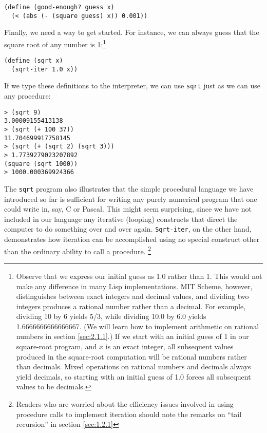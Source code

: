 \begin{verbatim}
(define (good-enough? guess x)
  (< (abs (- (square guess) x)) 0.001))
\end{verbatim}

Finally, we need a way to get started.  For instance, we can always
guess that the square root of any number is 1:\footnote{Observe that
  we express our initial guess as 1.0 rather than 1.  This would not
  make any difference in many Lisp implementations. MIT Scheme,
  however, distinguishes between exact integers and decimal values,
  and dividing two integers produces a rational number rather than a
  decimal.  For example, dividing 10 by 6 yields 5/3, while dividing
  10.0 by 6.0 yields 1.6666666666666667.  (We will learn how to
  implement arithmetic on rational numbers in section
  \ref{sec:2.1.1}.)  If we start with an initial guess of 1 in our
  square-root program, and $x$ is an exact integer, all subsequent
  values produced in the square-root computation will be rational
  numbers rather than decimals.  Mixed operations on rational numbers
  and decimals always yield decimals, so starting with an initial
  guess of 1.0 forces all subsequent values to be decimals.}

\begin{verbatim}
(define (sqrt x)
  (sqrt-iter 1.0 x))
\end{verbatim}

If we type these definitions to the interpreter, we can use \texttt{sqrt}
just as we can use any procedure:

\begin{verbatim}
> (sqrt 9)
3.00009155413138
> (sqrt (+ 100 37))
11.704699917758145
> (sqrt (+ (sqrt 2) (sqrt 3)))
> 1.7739279023207892
(square (sqrt 1000))
> 1000.000369924366
\end{verbatim}

The \texttt{sqrt} program also illustrates that the simple procedural
language we have introduced so far is sufficient for writing any
purely numerical program that one could write in, say, C or Pascal.
This might seem surprising, since we have not included in our language
any iterative (looping) constructs that direct the computer to do
something over and over again.  \texttt{Sqrt-iter}, on the other hand,
demonstrates how iteration can be accomplished using no special
construct other than the ordinary ability to call a procedure.
\footnote{Readers who are worried about the efficiency issues involved
  in using procedure calls to implement iteration should note the
  remarks on ``tail recursion'' in section \ref{sec:1.2.1}}

